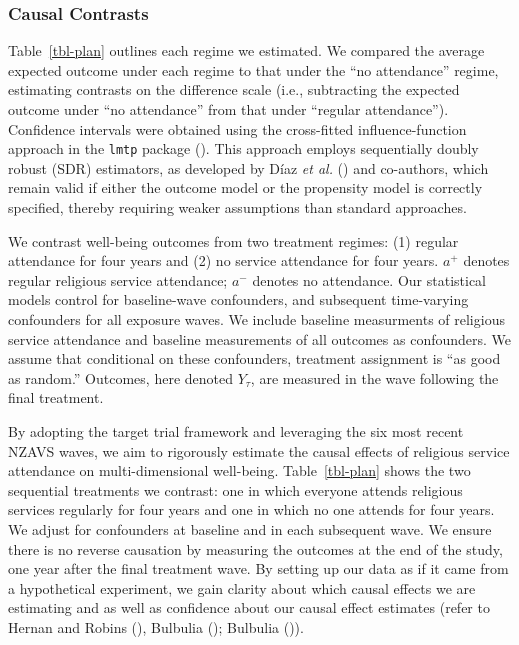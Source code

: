 \documentclass[
  single column]{article}
\begin{document}
\subsubsection{Causal Contrasts}\label{causal-contrasts}

Table~\ref{tbl-plan} outlines each regime we estimated. We compared the
average expected outcome under each regime to that under the ``no
attendance'' regime, estimating contrasts on the difference scale (i.e.,
subtracting the expected outcome under ``no attendance'' from that under
``regular attendance''). Confidence intervals were obtained using the
cross-fitted influence-function approach in the \texttt{lmtp} package
(). This approach
employs sequentially doubly robust (SDR) estimators, as developed by
Díaz \emph{et al.} ()
and co-authors, which remain valid if either the outcome model or the
propensity model is correctly specified, thereby requiring weaker
assumptions than standard approaches.

\begin{table}

\caption{\label{tbl-plan}We contrast well-being outcomes from two
treatment regimes: (1) regular attendance for four years and (2) no
service attendance for four years. \(a^{+}\) denotes regular religious
service attendance; \(a^{-}\) denotes no attendance. Our statistical
models control for baseline-wave confounders, and subsequent
time-varying confounders for all exposure waves. We include baseline
measurments of religious service attendance and baseline measurements of
all outcomes as confounders. We assume that conditional on these
confounders, treatment assignment is ``as good as random.'' Outcomes,
here denoted \(Y_\tau\), are measured in the wave following the final
treatment.}

\centering{

\vizfive

}

\end{table}%

By adopting the target trial framework and leveraging the six most
recent NZAVS waves, we aim to rigorously estimate the causal effects of
religious service attendance on multi-dimensional well-being.
Table~\ref{tbl-plan} shows the two sequential treatments we contrast:
one in which everyone attends religious services regularly for four
years and one in which no one attends for four years. We adjust for
confounders at baseline and in each subsequent wave. We ensure there is
no reverse causation by measuring the outcomes at the end of the study,
one year after the final treatment wave. By setting up our data as if it
came from a hypothetical experiment, we gain clarity about which causal
effects we are estimating and as well as confidence about our causal
effect estimates (refer to Hernan and Robins
(), Bulbulia
(); Bulbulia
()).
\end{document}
